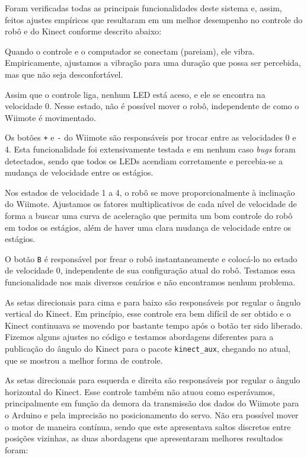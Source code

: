 Foram verificadas todas as principais funcionalidades deste sistema e, assim, feitos ajustes empíricos que resultaram em um melhor desempenho no controle do robô e do Kinect conforme descrito abaixo:

\begin{compactitem}
\item Quando o controle e o computador se conectam (pareiam), ele vibra. Empiricamente, ajustamos a vibração para uma duração que possa ser percebida, mas que não seja desconfortável.
\item Assim que o controle liga, nenhum LED está aceso, e ele se encontra na velocidade 0. Nesse estado, não é possível mover o robô, independente de como o Wiimote é movimentado.
\item Os botões \verb|+| e \verb|-| do Wiimote são responsáveis por trocar entre as velocidades 0 e 4. Esta funcionalidade foi extensivamente testada e em nenhum caso \textit{bugs} foram detectados, sendo que todos os LEDs acendiam corretamente e percebia-se a mudança de velocidade entre os estágios.
\item Nos estados de velocidade 1 a 4, o robô se move proporcionalmente à inclinação do Wiimote. Ajustamos os fatores multiplicativos de cada nível de velocidade de forma a buscar uma curva de aceleração que permita um bom controle do robô em todos os estágios, além de haver uma clara mudança de velocidade entre os estágios.
\item O botão \verb|B| é responsável por frear o robô instantaneamente e colocá-lo no estado de velocidade 0, independente de sua configuração atual do robô. Testamos essa funcionalidade nos mais diversos cenários e não encontramos nenhum problema.
\item As setas direcionais para cima e para baixo são responsáveis por regular o ângulo vertical do Kinect. Em princípio, esse controle era bem difícil de ser obtido e o Kinect continuava se movendo por bastante tempo após o botão ter sido liberado. Fizemos alguns ajustes no código e testamos abordagens diferentes para a publicação do ângulo do Kinect para o pacote \verb|kinect_aux|, chegando no atual, que se mostrou a melhor forma de controle.
\item As setas direcionais para esquerda e direita são responsáveis por regular o ângulo horizontal do Kinect. Esse controle também não atuou como esperávamos, principalmente em função da demora da transmissão dos dados do Wiimote para o Arduino e pela imprecisão no posicionamento do servo. Não era possível mover o motor de maneira contínua, sendo que este apresentava saltos discretos entre posições vizinhas, as duas abordagens que apresentaram melhores resultados foram:

\end{compactitem}
